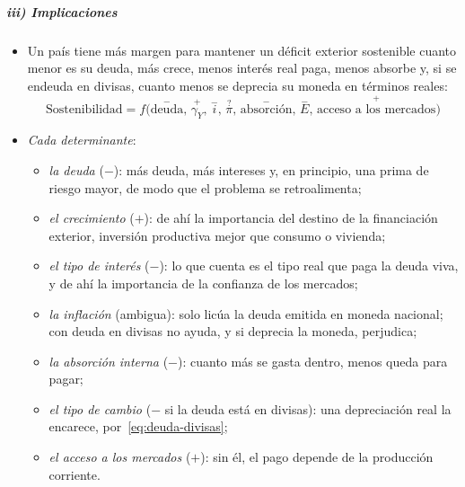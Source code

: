 \documentclass[11pt]{article}
\begin{document}
\subparagraph{iii) Implicaciones}

\begin{itemize}
\item Un país tiene más margen para mantener un déficit exterior sostenible cuanto menor es su deuda, más crece, menos interés real paga, menos absorbe y, si se endeuda en divisas, cuanto menos se deprecia su moneda en términos reales:
  \[
  \text{Sostenibilidad}=f\big(\overset{-}{\text{deuda}},\,\overset{+}{\gamma_Y},\,\overset{-}{i},\,\overset{?}{\pi},\,\overset{-}{\text{absorción}},\,\overset{-}{E},\,\overset{+}{\text{acceso a los mercados}}\big)
  \]
\item \emph{Cada determinante}:
  \begin{itemize}
  \item \emph{la deuda} ($-$): más deuda, más intereses y, en principio, una prima de riesgo mayor, de modo que el problema se retroalimenta;
  \item \emph{el crecimiento} ($+$): de ahí la importancia del destino de la financiación exterior, inversión productiva mejor que consumo o vivienda;
  \item \emph{el tipo de interés} ($-$): lo que cuenta es el tipo real que paga la deuda viva, y de ahí la importancia de la confianza de los mercados;
  \item \emph{la inflación} (ambigua): solo licúa la deuda emitida en moneda nacional; con deuda en divisas no ayuda, y si deprecia la moneda, perjudica;
  \item \emph{la absorción interna} ($-$): cuanto más se gasta dentro, menos queda para pagar;
  \item \emph{el tipo de cambio} ($-$ si la deuda está en divisas): una depreciación real la encarece, por~\eqref{eq:deuda-divisas};
  \item \emph{el acceso a los mercados} ($+$): sin él, el pago depende de la producción corriente.
  \end{itemize}
\end{itemize}
\end{document}
